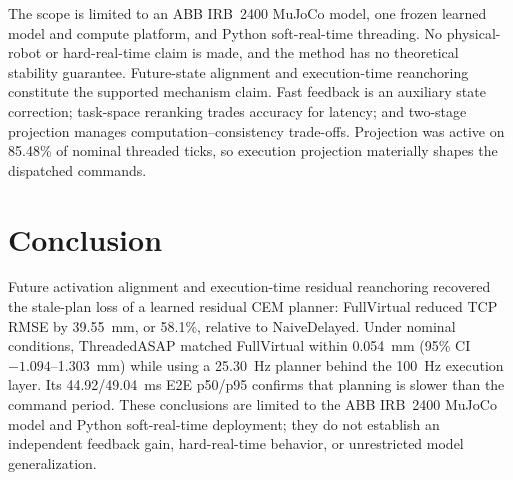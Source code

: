 \documentclass[conference]{IEEEtran}
\begin{document}
The scope is limited to an ABB IRB~2400 MuJoCo model, one frozen learned model and compute platform, and Python soft-real-time threading. No physical-robot or hard-real-time claim is made, and the method has no theoretical stability guarantee. Future-state alignment and execution-time reanchoring constitute the supported mechanism claim. Fast feedback is an auxiliary state correction; task-space reranking trades accuracy for latency; and two-stage projection manages computation--consistency trade-offs. Projection was active on 85.48\% of nominal threaded ticks, so execution projection materially shapes the dispatched commands.

\section{Conclusion}
Future activation alignment and execution-time residual reanchoring recovered the stale-plan loss of a learned residual CEM planner: FullVirtual reduced TCP RMSE by 39.55~mm, or 58.1\%, relative to NaiveDelayed. Under nominal conditions, ThreadedASAP matched FullVirtual within 0.054~mm (95\% CI $-1.094$--1.303~mm) while using a 25.30~Hz planner behind the 100~Hz execution layer. Its 44.92/49.04~ms E2E p50/p95 confirms that planning is slower than the command period. These conclusions are limited to the ABB IRB~2400 MuJoCo model and Python soft-real-time deployment; they do not establish an independent feedback gain, hard-real-time behavior, or unrestricted model generalization.



\end{document}
